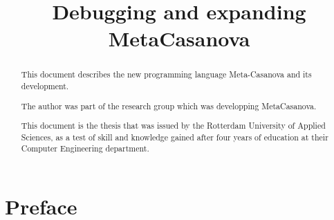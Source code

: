 


\title{Debugging and expanding MetaCasanova}
\author{\writer}

\begin{titlepage}
   
\end{titlepage}


   \begin{abstract}
      This document describes the new programming language Meta-Casanova and its development.

The author was part of the research group which was developping MetaCasanova.

This document is the thesis that was issued by the Rotterdam University of Applied Sciences, as a test of skill and knowledge gained after four years of education at their Computer Engineering department.
   \end{abstract}
   \newpage


   \setcounter{tocdepth}{1}
   \tableofcontents
   \cleardoublepage
   \addtocounter{page}{4}


\part{Preface}
% 
   

